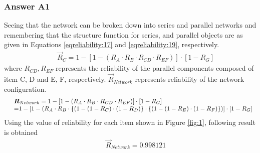 \subsubsection{Answer A1}
Seeing that the network can be broken down into series and parallel networks and
remembering that the structure function for series, and parallel objects are as
given in Equations \eqref{eqreliability:17} and \eqref{eqreliability:19}, respectively.
\begin{eqnarray}
&& {\vec R_C} = 1 - \left[ {1 - ({R_A} \cdot {R_B} \cdot {R_{CD}} \cdot {R_{EF}})}
\right] \cdot \left[ {1 - {R_G}} \right]
\label{eq-reliability-a3}
\end{eqnarray}
where ${R_{CD}},{R_{EF}}$ represents the reliability of the parallel components
composed of item C, D and E, F, respectively. ${\vec R_{Network}}$ represents
reliability of the network configuration.
%
\begin{eqnarray}
&& \begin{array}{l}
{{\vec R}_{Network}} = 1 - \left[ {1 - ({R_A} \cdot {R_B} \cdot {R_{CD}} \cdot
{R_{EF}})} \right] \cdot \left[ {1 - {R_G}} \right]\\
{\rm{      =  }}1 - \left[ {1 - ({R_A} \cdot {R_B} \cdot \left\{ {(1 - (1 -
{R_C}) \cdot (1 - {R_D})} \right\} \cdot \left\{ {(1 - (1 - {R_E}) \cdot (1 -
{R_F})} \right\})} \right] \cdot \left[ {1 - {R_G}} \right]
\end{array}
\label{eq-reliability-a4}
\end{eqnarray}
Using the value of reliability for each item shown in Figure \ref{fig:1},
following result is obtained
\begin{eqnarray}
&& {\vec R_{Network}} = 0.998121 \nonumber
\end{eqnarray}
%
